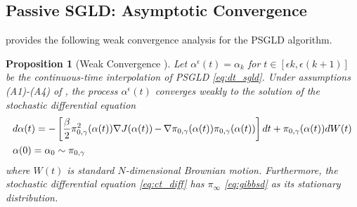 \documentclass[journal,onecolumn]{IEEEtran}
\newtheorem{proposition}{Proposition}
\newcommand{\alk}{\alpha_k}
\newcommand{\step}{\epsilon}
\newcommand{\grad}{\nabla}
\newcommand{\rew}{J}
\newcommand{\alt}{\alpha(t)}
\newcommand{\altm}{\alpha^{\step}(t)}
\newcommand{\brownt}{W(t)}
\newcommand{\dimn}{N}
\newcommand{\gibbs}{\ids_{\infty}}
\newcommand{\ids}{\pi}
\newcommand{\idw}{\gamma}
\newcommand{\isp}{0,\idw}
\newcommand{\idistrw}{\ids_{\isp}}
\begin{document}
\subsection{Passive SGLD: Asymptotic Convergence} 
 \cite{krishnamurthy2021langevin} provides the following weak convergence analysis  for the PSGLD algorithm.
\begin{proposition}[Weak Convergence \cite{krishnamurthy2021langevin}]
\label{prop:wca}
    Let $\altm = \alk$ for $t \in [\step k, \step (k+1)]$ be the continuous-time interpolation of PSGLD \eqref{eq:dt_sgld}. Under assumptions (A1)-(A4) of \cite{krishnamurthy2021langevin}, the process $\altm$ converges weakly to the solution of the stochastic differential equation
    \begin{gather}
    \begin{aligned}
    \begin{split}
    \label{eq:ct_diff}
    &d\alt = -\left[\frac{\beta}{2}\idistrw^2(\alt)\grad\rew(\alt) \,\color{black}{-}\, \grad\idistrw(\alt)\idistrw(\alt)\right]dt + \idistrw(\alt)d\brownt \\
    &\alpha(0) = \alpha_0 \sim \idistrw
    \end{split}
    \end{aligned}\raisetag{0\baselineskip}
    \end{gather}
where $\brownt$ is standard $\dimn$-dimensional Brownian motion. Furthermore, the stochastic differential equation \eqref{eq:ct_diff} has $\gibbs$ \eqref{eq:gibbsd} as its stationary distribution. 
\end{proposition}
\end{document}
